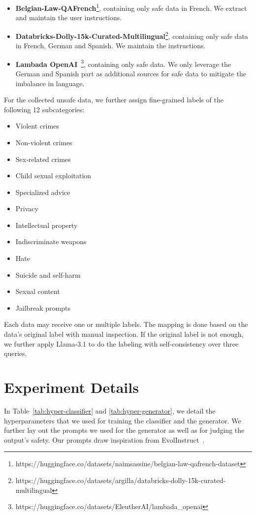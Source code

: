 \begin{itemize}
    \item \textbf{Belgian-Law-QAFrench}\footnote{https://huggingface.co/datasets/naimsassine/belgian-law-qafrench-dataset}, containing only safe data in French. We extract and maintain the user instructions. 
    \item \textbf{Databricks-Dolly-15k-Curated-Multilingual}\footnote{https://huggingface.co/datasets/argilla/databricks-dolly-15k-curated-multilingual}, containing only safe data in French, German and Spanish. We maintain the instructions.
    \item \textbf{Lambada OpenAI}~\citep{radford2019language}\footnote{https://huggingface.co/datasets/EleutherAI/lambada\_openai}, containing only safe data. We only leverage the German and Spanish part as additional sources for safe data to mitigate the imbalance in language.
\end{itemize}

For the collected unsafe data, we further assign fine-grained labels of the following 12 subcategories:
\begin{itemize}
    \item Violent crimes
    \item Non-violent crimes
    \item Sex-related crimes
    \item Child sexual exploitation
    \item Specialized advice
    \item Privacy
    \item Intellectual property
    \item Indiscriminate weapons
    \item Hate 
    \item Suicide and self-harm
    \item Sexual content
    \item Jailbreak prompts
\end{itemize}
Each data may receive one or multiple labels. The mapping is done based on the data's original label with manual inspection. If the original label is not enough, we further apply Llama-3.1 to do the labeling with self-consistency over three queries. 

\section{Experiment Details}\label{app:exp}
In Table~\ref{tab:hyper-classifier} and \ref{tab:hyper-generator}, we detail the hyperparameters that we used for training the classifier and the generator. We further lay out the prompts we used for the generator as well as for judging the output's safety. Our prompts draw inspiration from EvolInstruct~\citep{xu2023wizardlm}.

